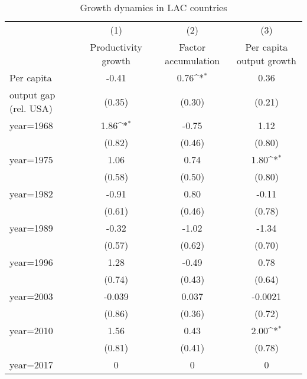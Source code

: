 \begin{table}[htbp]\centering
\def\sym#1{\ifmmode^{#1}\else\(^{#1}\)\fi}
\caption{Growth dynamics in LAC countries}
\begin{tabular}{l*{3}{c}}
\toprule
                &\multicolumn{1}{c}{(1)}&\multicolumn{1}{c}{(2)}&\multicolumn{1}{c}{(3)}\\
                &\multicolumn{1}{c}{Productivity growth}&\multicolumn{1}{c}{Factor accumulation}&\multicolumn{1}{c}{Per capita output growth}\\
\midrule
Per capita      &    -0.41         &     0.76\sym{*}  &     0.36         \\
output gap (rel. USA)&   (0.35)         &   (0.30)         &   (0.21)         \\
\addlinespace
year=1968       &     1.86\sym{*}  &    -0.75         &     1.12         \\
                &   (0.82)         &   (0.46)         &   (0.80)         \\
\addlinespace
year=1975       &     1.06         &     0.74         &     1.80\sym{*}  \\
                &   (0.58)         &   (0.50)         &   (0.80)         \\
\addlinespace
year=1982       &    -0.91         &     0.80         &    -0.11         \\
                &   (0.61)         &   (0.46)         &   (0.78)         \\
\addlinespace
year=1989       &    -0.32         &    -1.02         &    -1.34         \\
                &   (0.57)         &   (0.62)         &   (0.70)         \\
\addlinespace
year=1996       &     1.28         &    -0.49         &     0.78         \\
                &   (0.74)         &   (0.43)         &   (0.64)         \\
\addlinespace
year=2003       &   -0.039         &    0.037         &  -0.0021         \\
                &   (0.86)         &   (0.36)         &   (0.72)         \\
\addlinespace
year=2010       &     1.56         &     0.43         &     2.00\sym{*}  \\
                &   (0.81)         &   (0.41)         &   (0.78)         \\
\addlinespace
year=2017       &        0         &        0         &        0         \\

\end{tabular}
\end{table}

